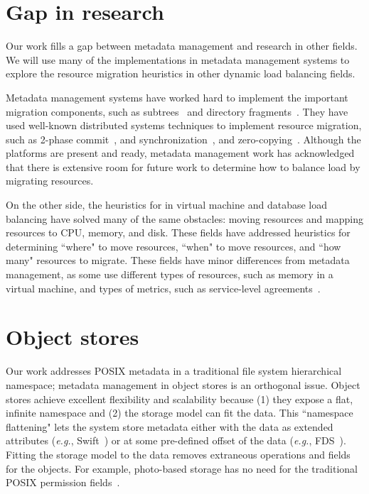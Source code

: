 \section{Gap in research}
Our work fills a gap between metadata management and research in other fields. We will use many of the implementations in metadata management systems to explore the resource migration heuristics in other dynamic load balancing fields.

Metadata management systems have worked hard to implement the important migration components, such as subtrees~\cite{weil:osdi2006-ceph,weil:sc2004-dyn-metadata} and directory fragments~\cite{patil:pdsw2007-giga+}. They have used well-known distributed systems techniques to implement resource migration, such as 2-phase commit~\cite{weil:phdthesis07}, and synchronization~\cite{patil:pdsw2007-giga+}, and zero-copying~\cite{sinnamohideen:atc2010-ursa}. Although the platforms are present and ready, metadata management work has acknowledged that there is extensive room for future work to determine how to balance load by migrating resources. 

On the other side, the heuristics for in virtual machine and database load balancing have solved many of the same obstacles: moving resources and mapping resources to CPU, memory, and disk. These fields have addressed heuristics for determining ``where" to move resources, ``when" to move resources, and ``how many" resources to migrate. These fields have minor differences from metadata management, as some use different types of resources, such as memory in a virtual machine, and types of metrics, such as service-level agreements~\cite{wood:nsdi07-sandpiper}. 

\section{Object stores}
Our work addresses POSIX metadata in a traditional file system hierarchical namespace; metadata management in object stores is an orthogonal issue. Object stores achieve excellent flexibility and scalability because (1) they expose a flat, infinite namespace and (2) the storage model can fit the data. This ``namespace flattening" lets the system store metadata either with the data as extended attributes ({\it e.g.}, Swift~\cite{toor:nas2012-swift}) or at some pre-defined offset of the data ({\it e.g.}, FDS~\cite{nightingale:osdi2012-fds}). Fitting the storage model to the data removes extraneous operations and fields for the objects. For example, photo-based storage has no need for the traditional POSIX permission fields~\cite{beaver:osdi2010-haystack}. 

